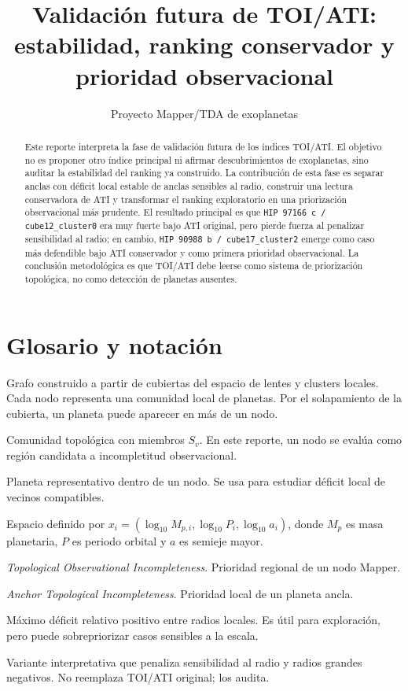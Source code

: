 \documentclass[11pt]{article}
\title{Validación futura de TOI/ATI: estabilidad, ranking conservador y prioridad observacional}
\author{Proyecto Mapper/TDA de exoplanetas}
\date{}
\begin{document}
\maketitle

\begin{abstract}
Este reporte interpreta la fase de validación futura de los índices TOI/ATI. El objetivo no es proponer otro índice principal ni afirmar descubrimientos de exoplanetas, sino auditar la estabilidad del ranking ya construido. La contribución de esta fase es separar anclas con déficit local estable de anclas sensibles al radio, construir una lectura conservadora de ATI y transformar el ranking exploratorio en una priorización observacional más prudente. El resultado principal es que \texttt{HIP 97166 c / cube12\_cluster0} era muy fuerte bajo ATI original, pero pierde fuerza al penalizar sensibilidad al radio; en cambio, \texttt{HIP 90988 b / cube17\_cluster2} emerge como caso más defendible bajo ATI conservador y como primera prioridad observacional. La conclusión metodológica es que TOI/ATI debe leerse como sistema de priorización topológica, no como detección de planetas ausentes.
\end{abstract}

\section{Glosario y notación}

\begin{description}[leftmargin=3.4cm,style=nextline]
    \item[Mapper] Grafo construido a partir de cubiertas del espacio de lentes y clusters locales. Cada nodo representa una comunidad local de planetas. Por el solapamiento de la cubierta, un planeta puede aparecer en más de un nodo.
    \item[Nodo Mapper $v$] Comunidad topológica con miembros $S_v$. En este reporte, un nodo se evalúa como región candidata a incompletitud observacional.
    \item[Planeta ancla $p^*$] Planeta representativo dentro de un nodo. Se usa para estudiar déficit local de vecinos compatibles.
    \item[$R^3$ físico-orbital] Espacio definido por $x_i=(\log_{10}M_{p,i},\log_{10}P_i,\log_{10}a_i)$, donde $M_p$ es masa planetaria, $P$ es periodo orbital y $a$ es semieje mayor.
    \item[TOI] \textit{Topological Observational Incompleteness}. Prioridad regional de un nodo Mapper.
    \item[ATI] \textit{Anchor Topological Incompleteness}. Prioridad local de un planeta ancla.
    \item[$\Delta_{\mathrm{rel,best}}$] Máximo déficit relativo positivo entre radios locales. Es útil para exploración, pero puede sobrepriorizar casos sensibles a la escala.
    \item[ATI conservador] Variante interpretativa que penaliza sensibilidad al radio y radios grandes negativos. No reemplaza TOI/ATI original; los audita.
\end{description}
\end{document}
